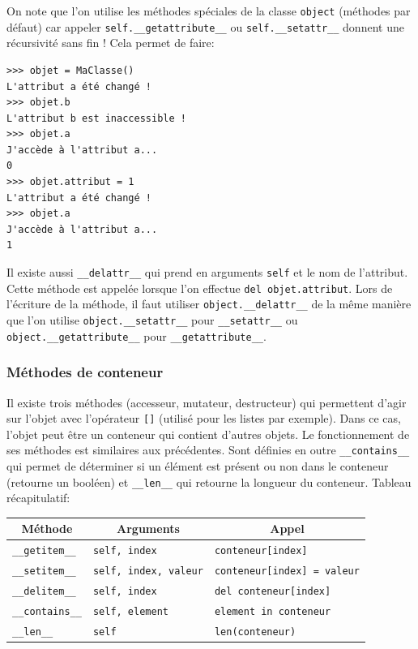 \documentclass[a4paper, 10pt]{article}
\newcommand{\code}[1]{{\small\texttt{#1}}}
\begin{document}
On note que l'on utilise les méthodes spéciales de la classe \code{object} (méthodes par défaut) car appeler \code{self.\_\_getattribute\_\_} ou \code{self.\_\_setattr\_\_} donnent une récursivité sans fin ! Cela permet de faire:
\begin{Verbatim}[fontsize = \footnotesize, frame = single]
>>> objet = MaClasse()
L'attribut a été changé !
>>> objet.b
L'attribut b est inaccessible !
>>> objet.a
J'accède à l'attribut a...
0
>>> objet.attribut = 1
L'attribut a été changé !
>>> objet.a
J'accède à l'attribut a...
1
\end{Verbatim}
Il existe aussi \code{\_\_delattr\_\_} qui prend en arguments \code{self} et le nom de l'attribut. Cette méthode est appelée lorsque l'on effectue \code{del objet.attribut}. Lors de l'écriture de la méthode, il faut utiliser \code{object.\_\_delattr\_\_} de la même manière que l'on utilise \code{object.\_\_setattr\_\_} pour \code{\_\_setattr\_\_} ou \code{object.\_\_getattribute\_\_} pour \code{\_\_getattribute\_\_}.\bigskip

\subsubsection{Méthodes de conteneur}
Il existe trois méthodes (accesseur, mutateur, destructeur) qui permettent d'agir sur l'objet avec l'opérateur \code{[]} (utilisé pour les listes par exemple). Dans ce cas, l'objet peut être un conteneur qui contient d'autres objets. Le fonctionnement de ses méthodes est similaires aux précédentes. Sont définies en outre \code{\_\_contains\_\_} qui permet de déterminer si un élément est présent ou non dans le conteneur (retourne un booléen) et \code{\_\_len\_\_} qui retourne la longueur du conteneur. Tableau récapitulatif:
\begin{center}
        \begin{tabular}{|p{2.5cm}|p{3.5 cm}|p{5cm}|}
        \hline
        \multicolumn{1}{|c}{\bf Méthode} & \multicolumn{1}{|c}{\bf Arguments} & \multicolumn{1}{|c|}{\bf Appel} \\
        \hline
        \code{\_\_getitem\_\_} & \code{self, index} & \code{conteneur[index]}\\
        \hline
        \code{\_\_setitem\_\_} & \code{self, index, valeur} & \code{conteneur[index] = valeur}\\
        \hline
        \code{\_\_delitem\_\_} & \code{self, index} & \code{del conteneur[index]}\\
        \hline
        \code{\_\_contains\_\_} & \code{self, element} & \code{element in conteneur}\\
        \hline
        \code{\_\_len\_\_} & \code{self} & \code{len(conteneur)}\\
        \hline
\end{tabular}
\end{center}
\end{document}
